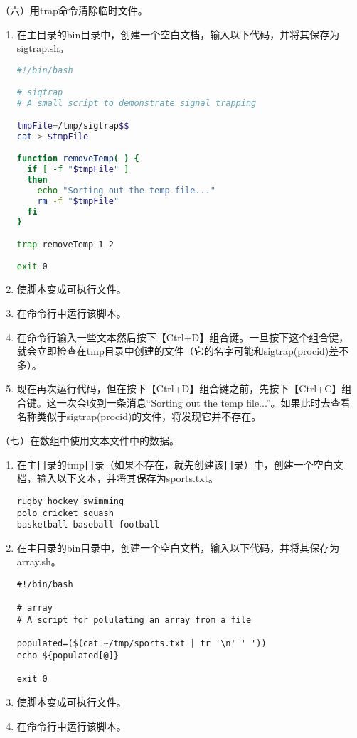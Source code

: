 \vspace{0.1in}
（六）用trap命令清除临时文件。
\begin{enumerate}
  \item 在主目录的bin目录中，创建一个空白文档，输入以下代码，并将其保存为sigtrap.sh。
\begin{lstlisting}[language=bash]
#!/bin/bash

# sigtrap
# A small script to demonstrate signal trapping

tmpFile=/tmp/sigtrap$$
cat > $tmpFile

function removeTemp( ) {
  if [ -f "$tmpFile" ]
  then
    echo "Sorting out the temp file..."
    rm -f "$tmpFile"
  fi
}

trap removeTemp 1 2

exit 0
\end{lstlisting}
  \item 使脚本变成可执行文件。
  \item 在命令行中运行该脚本。
  \item 在命令行输入一些文本然后按下【Ctrl+D】组合键。一旦按下这个组合键，就会立即检查在tmp目录中创建的文件（它的名字可能和sigtrap(procid)差不多）。
  \item 现在再次运行代码，但在按下【Ctrl+D】组合键之前，先按下【Ctrl+C】组合键。这一次会收到一条消息``Sorting out the temp file...''。如果此时去查看名称类似于sigtrap(procid)的文件，将发现它并不存在。
\end{enumerate}

\vspace{0.1in}
（七）在数组中使用文本文件中的数据。
\begin{enumerate}
  \item 在主目录的tmp目录（如果不存在，就先创建该目录）中，创建一个空白文档，输入以下文本，并将其保存为sports.txt。
\begin{verbatim}
rugby hockey swimming
polo cricket squash
basketball baseball football
\end{verbatim}
  \item 在主目录的bin目录中，创建一个空白文档，输入以下代码，并将其保存为array.sh。
\begin{lstlisting}
#!/bin/bash

# array
# A script for polulating an array from a file

populated=($(cat ~/tmp/sports.txt | tr '\n' ' '))
echo ${populated[@]}

exit 0
\end{lstlisting}
  \item 使脚本变成可执行文件。
  \item 在命令行中运行该脚本。
\end{enumerate}

